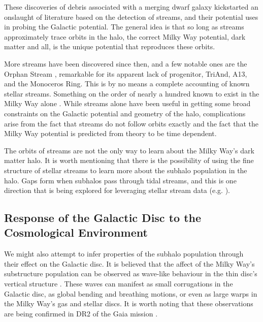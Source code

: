 These discoveries of debris associated with a merging dwarf galaxy kickstarted an onslaught of literature based on the detection of streams, and their potential uses in probing the Galactic potential. The general idea is that so long as streams approximately trace orbits in the halo, the correct Milky Way potential, dark matter and all, is the unique potential that reproduces these orbits. 

More streams have been discovered since then, and a few notable ones are the Orphan Stream \citep{grillmair_2006,belokurov_2007,newberg_2010}, remarkable for its apparent lack of progenitor, TriAnd, A13, and the Monoceros Ring. This is by no means a complete accounting of known stellar streams. Something on the order of nearly a hundred known to exist in the Milky Way alone \citep{sanders_binney_2013_a, ibata_2019}. While streams alone have been useful in getting some broad constraints on the Galactic potential and geometry of the halo, complications arise from the fact that streams do not follow orbits exactly \citep{sanders_binney_2013_a} and the fact that the Milky Way potential is predicted from theory to be time dependent.

The orbits of streams are not the only way to learn about the Milky Way's dark matter halo. It is worth mentioning that there is the possibility of using the fine structure of stellar streams to learn more about the subhalo population in the halo.  Gaps form when subhalos pass through tidal streams, and this is one direction that is being explored for leveraging stellar stream data (e.g. \citet{erkal_2016_stream_gaps}).

\subsection{Response of the Galactic Disc to the Cosmological Environment}


We might also attempt to infer properties of the subhalo population through their effect on the Galactic disc.  It is believed that the affect of the Milky Way's substructure population can be observed as wave-like behaviour in the thin disc's vertical structure \citep{widrow_2012_sdss,carlin_2013_lamost, williams_2013_rave,xu_2015, carrillo_2018_rave}.  These waves can manifest as small corrugations in the Galactic disc, as global bending and breathing motions, or even as large warps in the Milky Way's gas  \citep{gasWarp} and stellar discs. It is worth noting that these observations are being confirmed in DR2 of the Gaia mission \citep[for example]{gaia_collab,bennet_2019_gaia}.

